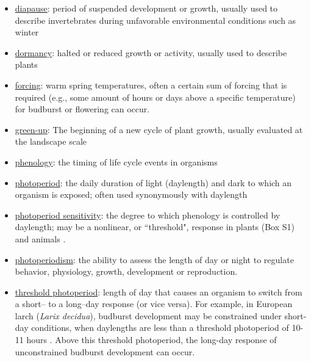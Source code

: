 \documentclass{article}
\begin{document}
\begin{itemize}
\item \underline{diapause}: period of suspended development or growth, usually used to describe invertebrates during unfavorable environmental conditions such as winter
\item \underline{dormancy}: halted or reduced growth or activity, usually used to describe plants
\item \underline{forcing}: warm spring temperatures, often a certain sum of forcing that is  required (e.g., some amount of hours or days above a specific temperature) for budburst or flowering can occur.
\item \underline{green-up}: The beginning of a new cycle of plant growth, usually evaluated at the landscape scale
\item \underline{phenology}: the timing of life cycle events in organisms
\item \underline{photoperiod}: the daily duration of light (daylength) and dark to which an organism is exposed; often used synonymously with daylength
\item \underline{photoperiod sensitivity}: the degree to which phenology is controlled by daylength; may be a nonlinear, or ``threshold", response in plants (Box S1) and animals \citep{tobin2008,grevstad2015}.
\item \underline{photoperiodism}: the ability to assess the length of day or night to regulate behavior, physiology, growth, development or reproduction.
\item \underline{threshold photoperiod}: length of day that causes an organism to switch from a short-- to a long--day response (or vice versa). For example, in European larch (\emph{Larix decidua}), budburst development may be constrained under short-day conditions, when daylengths are less than a threshold photoperiod of 10-11 hours \citep{migliavacca2008}. Above this threshold photoperiod, the long-day response of unconstrained budburst development can occur.
\end{itemize}
\end{document}
